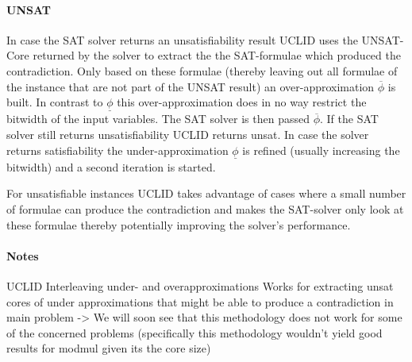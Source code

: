 \paragraph{UNSAT} In case the SAT solver returns an unsatisfiability result \textsc{UCLID} uses the UNSAT-Core returned by the solver to extract the the SAT-formulae which produced the contradiction. Only based on these formulae (thereby leaving out all formulae of the instance that are not part of the UNSAT result) an over-approximation $\overline{\phi}$ is built. In contrast to $\underline{\phi}$ this over-approximation does in no way restrict the bitwidth of the input variables. The SAT solver is then passed $\overline{\phi}$. If the SAT solver still returns unsatisfiability \textsc{UCLID} returns unsat. In case the solver returns satisfiability the under-approximation $\underline{\phi}$ is refined (usually increasing the bitwidth) and a second iteration is started.
\par
For unsatisfiable instances \textsc{UCLID} takes advantage of cases where a small number of formulae can produce the contradiction and makes the SAT-solver only look at these formulae thereby potentially improving the solver's performance.

\paragraph{Notes}
UCLID
Interleaving under- and overapproximations
Works for extracting unsat cores of under approximations that might be able to produce a contradiction in main problem
-> We will soon see that this methodology does not work for some of the concerned problems (specifically this methodology wouldn't yield good results for modmul given its the core size)
